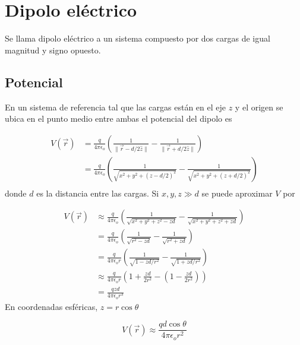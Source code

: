 \section{Dipolo eléctrico}

Se llama dipolo eléctrico a un sistema compuesto por dos cargas de igual magnitud y signo opuesto.


\subsection{Potencial}

En un sistema de referencia tal que las cargas están en el eje $z$ y el origen se ubica en el punto medio entre ambas el potencial del dipolo es

\begin{equation}
\begin{split}
    V(\Vec{r}) &= \frac{q}{4\pi\epsilon_o}\left(
    \frac{1}{\|\Vec{r}-d/2\hat{z}\|}-
    \frac{1}{\|\Vec{r}+d/2\hat{z}\|}\right)\\
     &= \frac{q}{4\pi\epsilon_o}\left(
    \frac{1}{\sqrt{x^2+y^2+(z-d/2)^2}}-
    \frac{1}{\sqrt{x^2+y^2+(z+d/2)^2}}\right)\\
\end{split}
\nonumber
\end{equation}
\bigbreak
\bigbreak
donde $d$ es la distancia entre las cargas. Si $x,y,z \gg d$ se puede aproximar $V$ por

\begin{equation}
\begin{split}
    V(\Vec{r}) &\approx \frac{q}{4\pi\epsilon_o}\left(
    \frac{1}{\sqrt{x^2+y^2+z^2-zd}}-
    \frac{1}{\sqrt{x^2+y^2+z^2+zd}}\right)\\
    &= \frac{q}{4\pi\epsilon_o}\left(
    \frac{1}{\sqrt{r^2-zd}}-
    \frac{1}{\sqrt{r^2+zd}}\right)\\
    &= \frac{q}{4\pi\epsilon_o r}\left(
    \frac{1}{\sqrt{1-zd/r^2}}-
    \frac{1}{\sqrt{1+zd/r^2}}\right)\\
    &\approx \frac{q}{4\pi\epsilon_o r}\left(
    1+\frac{zd}{2r^2}-\left(1-
    \frac{zd}{2r^2}\right)\right)\\
    &= \frac{qzd}{4\pi\epsilon_o r^3}
\end{split}
\nonumber
\end{equation}
\bigbreak
En coordenadas esféricas, $z=r\cos{\theta}$

\[V(\Vec{r})\approx\frac{qd\cos{\theta}}{4\pi\epsilon_o r^2}\]


